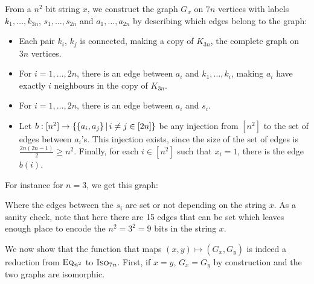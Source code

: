     From a $n^2$ bit string $x$, we construct the graph $G_x$
    on $7n$ vertices with labels $k_1, \dots, k_{3n}$, $s_1, \dots, s_{2n}$ and $a_1, \dots, a_{2n}$
    by describing which edges belong to the graph:
    \begin{itemize}
        \item Each pair $k_i$, $k_j$ is connected, 
            making a copy of $K_{3n}$, the complete graph on $3n$ vertices.
        \item For $i = 1, \dots, 2n$, there is an edge between 
            $a_i$ and $k_1, \dots, k_i$, 
            making $a_i$ have exactly $i$ neighbours in the copy of $K_{3n}$.
        \item For $i = 1, \dots, 2n$, there is an edge between 
            $a_i$ and $s_i$.
        \item Let $b: [n^2] \to \left\{ \left\{ a_i, a_j \right\} \, \middle| \, i \neq j \in [2n] \right\}$ be any injection from $[n^2]$ to the set of edges 
            between $a_i$'s. This injection exists, since the size of the set of edges 
            is $\frac{2n(2n - 1)}{2} \geq n^2$.
            Finally, for each $i \in [n^2]$ such that $x_i = 1$,
            there is the edge $b(i)$.
    \end{itemize}

    For instance for $n = 3$, we get this graph:

    \begin{center}
    \end{center}
    Where the edges between the $s_i$ are set or not depending on
    the string $x$. As a sanity check, note that here there are 
    15 edges that can be set which leaves enough place to encode
    the $n^2 = 3^2 = 9$ bits in the string $x$.

    We now show that the function that maps $(x, y) \mapsto (G_x, G_y)$
    is indeed a reduction from $\textsc{Eq}_{n^2}$ to $\textsc{Iso}_{7n}$.
    First, if $x = y$, $G_x = G_y$ by construction and the two
    graphs are isomorphic.
    
